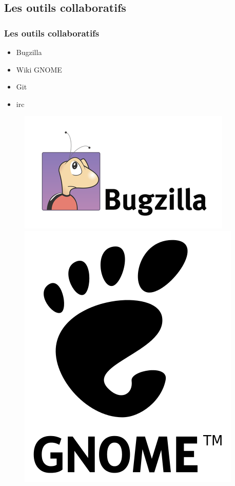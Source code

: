 \documentclass{beamer}
\begin{document}
\subsection{Les outils collaboratifs}
\begin{frame}
  \frametitle{Les outils collaboratifs}
  \begin{itemize}
  \item Bugzilla
  \item Wiki GNOME
  \item Git
  \item irc
  \end{itemize}
  \begin{figure}
    \includegraphics[scale=0.1]{images/bugzilla-logo.png} \hspace{1cm}
    \includegraphics[scale=0.04]{images/gnome-logo.png} \hspace{1cm}

\end{figure}
\end{frame}
\end{document}
